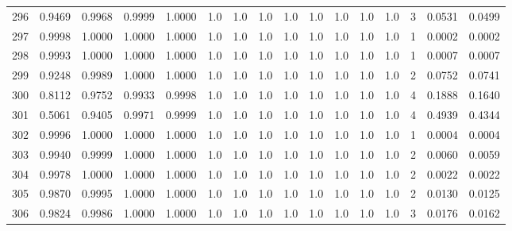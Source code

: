 \begin{tabular}{lrrrrrrrrrrrrrrr}
296 &      0.9469 &  0.9968 &  0.9999 &  1.0000 &     1.0 &     1.0 &     1.0 &     1.0 &     1.0 &     1.0 &      1.0 &        1.0 &      3 &                    0.0531 &                     0.0499 \\
297 &      0.9998 &  1.0000 &  1.0000 &  1.0000 &     1.0 &     1.0 &     1.0 &     1.0 &     1.0 &     1.0 &      1.0 &        1.0 &      1 &                    0.0002 &                     0.0002 \\
298 &      0.9993 &  1.0000 &  1.0000 &  1.0000 &     1.0 &     1.0 &     1.0 &     1.0 &     1.0 &     1.0 &      1.0 &        1.0 &      1 &                    0.0007 &                     0.0007 \\
299 &      0.9248 &  0.9989 &  1.0000 &  1.0000 &     1.0 &     1.0 &     1.0 &     1.0 &     1.0 &     1.0 &      1.0 &        1.0 &      2 &                    0.0752 &                     0.0741 \\
300 &      0.8112 &  0.9752 &  0.9933 &  0.9998 &     1.0 &     1.0 &     1.0 &     1.0 &     1.0 &     1.0 &      1.0 &        1.0 &      4 &                    0.1888 &                     0.1640 \\
301 &      0.5061 &  0.9405 &  0.9971 &  0.9999 &     1.0 &     1.0 &     1.0 &     1.0 &     1.0 &     1.0 &      1.0 &        1.0 &      4 &                    0.4939 &                     0.4344 \\
302 &      0.9996 &  1.0000 &  1.0000 &  1.0000 &     1.0 &     1.0 &     1.0 &     1.0 &     1.0 &     1.0 &      1.0 &        1.0 &      1 &                    0.0004 &                     0.0004 \\
303 &      0.9940 &  0.9999 &  1.0000 &  1.0000 &     1.0 &     1.0 &     1.0 &     1.0 &     1.0 &     1.0 &      1.0 &        1.0 &      2 &                    0.0060 &                     0.0059 \\
304 &      0.9978 &  1.0000 &  1.0000 &  1.0000 &     1.0 &     1.0 &     1.0 &     1.0 &     1.0 &     1.0 &      1.0 &        1.0 &      2 &                    0.0022 &                     0.0022 \\
305 &      0.9870 &  0.9995 &  1.0000 &  1.0000 &     1.0 &     1.0 &     1.0 &     1.0 &     1.0 &     1.0 &      1.0 &        1.0 &      2 &                    0.0130 &                     0.0125 \\
306 &      0.9824 &  0.9986 &  1.0000 &  1.0000 &     1.0 &     1.0 &     1.0 &     1.0 &     1.0 &     1.0 &      1.0 &        1.0 &      3 &                    0.0176 &                     0.0162 \\

\end{tabular}
